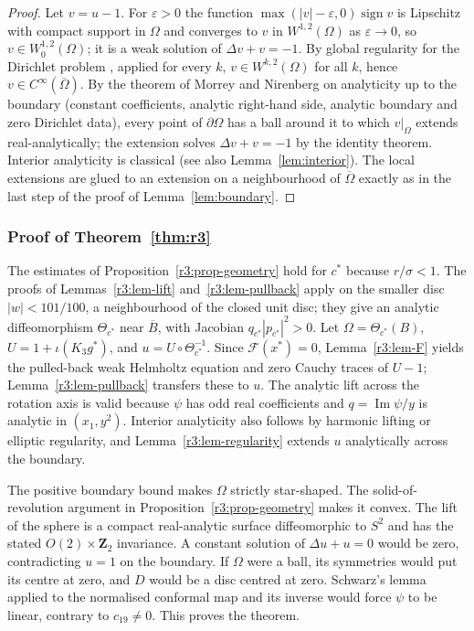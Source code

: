 \documentclass[11pt]{amsart}
\theoremstyle{definition}
\theoremstyle{remark}
\numberwithin{equation}{section}
\newcommand{\Fc}{\mathcal{F}}
\DeclareMathOperator{\im}{Im}
\begin{document}
\begin{proof}
Let $v=u-1$. For $\varepsilon>0$ the function $\max(|v|-\varepsilon,0)\operatorname{sign}v$ is Lipschitz with compact support in $\Omega$ and converges to $v$ in $W^{1,2}(\Omega)$ as $\varepsilon\to0$, so $v\in W^{1,2}_0(\Omega)$; it is a weak solution of $\Delta v+v=-1$. By global regularity for the Dirichlet problem \cite[Theorem~8.13]{GT01}, applied for every $k$, $v\in W^{k,2}(\Omega)$ for all $k$, hence $v\in C^\infty(\overline\Omega)$. By the theorem of Morrey and Nirenberg on analyticity up to the boundary \cite{MN57} (constant coefficients, analytic right-hand side, analytic boundary and zero Dirichlet data), every point of $\partial\Omega$ has a ball around it to which $v|_\Omega$ extends real-analytically; the extension solves $\Delta v+v=-1$ by the identity theorem. Interior analyticity is classical (see also Lemma~\ref{lem:interior}). The local extensions are glued to an extension on a neighbourhood of $\overline\Omega$ exactly as in the last step of the proof of Lemma~\ref{lem:boundary}.
\end{proof}

\subsubsection*{Proof of Theorem~\ref{thm:r3}}
The estimates of Proposition~\ref{r3:prop-geometry} hold for $c^*$ because $r/\sigma<1$. The proofs of Lemmas~\ref{r3:lem-lift} and~\ref{r3:lem-pullback} apply on the smaller disc $|w|<101/100$, a neighbourhood of the closed unit disc; they give an analytic diffeomorphism $\Theta_{c^*}$ near $\overline B$, with Jacobian $q_{c^*}|p_{c^*}|^2>0$. Let $\Omega=\Theta_{c^*}(B)$, $U=1+\iota(K_3g^*)$, and $u=U\circ\Theta_{c^*}^{-1}$. Since $\Fc(x^*)=0$, Lemma~\ref{r3:lem-F} yields the pulled-back weak Helmholtz equation and zero Cauchy traces of $U-1$; Lemma~\ref{r3:lem-pullback} transfers these to $u$. The analytic lift across the rotation axis is valid because $\psi$ has odd real coefficients and $q=\im\psi/y$ is analytic in $(x_1,y^2)$. Interior analyticity also follows by harmonic lifting or elliptic regularity, and Lemma~\ref{r3:lem-regularity} extends $u$ analytically across the boundary.

The positive boundary bound makes $\Omega$ strictly star-shaped. The solid-of-revolution argument in Proposition~\ref{r3:prop-geometry} makes it convex. The lift of the sphere is a compact real-analytic surface diffeomorphic to $S^2$ and has the stated $O(2)\times\mathbf Z_2$ invariance. A constant solution of $\Delta u+u=0$ would be zero, contradicting $u=1$ on the boundary. If $\Omega$ were a ball, its symmetries would put its centre at zero, and $D$ would be a disc centred at zero. Schwarz's lemma applied to the normalised conformal map and its inverse would force $\psi$ to be linear, contrary to $c_{19}\ne0$. This proves the theorem.
\end{document}
